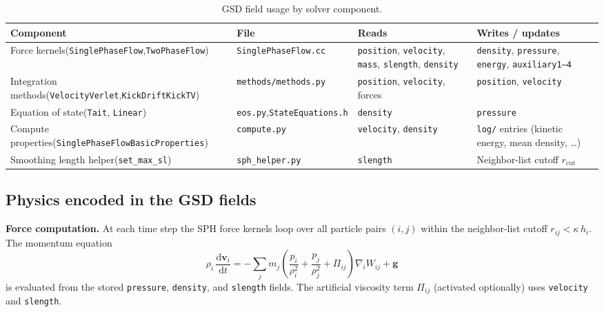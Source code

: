 \documentclass[10pt,a4paper]{article}
\begin{document}
\begin{table}[h]
\centering
\caption{GSD field usage by solver component.}
\label{tab:usage}
\small
\begin{tabular}{@{}p{3.2cm}lp{3.2cm}p{3.2cm}@{}}
\toprule
\textbf{Component} & \textbf{File} & \textbf{Reads} & \textbf{Writes / updates}\\
\midrule
Force kernels\newline (\texttt{SinglePhaseFlow},\newline \texttt{TwoPhaseFlow})
  & \texttt{SinglePhaseFlow.cc}
  & \texttt{position}, \texttt{velocity}, \texttt{mass}, \texttt{slength}, \texttt{density}
  & \texttt{density}, \texttt{pressure}, \texttt{energy}, \texttt{auxiliary1--4}\\[4pt]
Integration methods\newline (\texttt{VelocityVerlet},\newline \texttt{KickDriftKickTV})
  & \texttt{methods/methods.py}
  & \texttt{position}, \texttt{velocity}, forces
  & \texttt{position}, \texttt{velocity}\\[4pt]
Equation of state\newline (\texttt{Tait}, \texttt{Linear})
  & \texttt{eos.py},\newline \texttt{StateEquations.h}
  & \texttt{density}
  & \texttt{pressure}\\[4pt]
Compute properties\newline (\texttt{SinglePhaseFlow\-BasicProperties})
  & \texttt{compute.py}
  & \texttt{velocity}, \texttt{density}
  & \texttt{log/} entries (kinetic energy, mean density, \ldots)\\[4pt]
Smoothing length helper\newline (\texttt{set\_max\_sl})
  & \texttt{sph\_helper.py}
  & \texttt{slength}
  & Neighbor-list cutoff $r_\mathrm{cut}$\\
\bottomrule
\end{tabular}
\end{table}

\subsection{Physics encoded in the GSD fields}

\textbf{Force computation.}
At each time step the SPH force kernels loop over all particle pairs $(i,j)$
within the neighbor-list cutoff $r_{ij} < \kappa\,h_i$.  The momentum equation
\[
  \rho_i\,\frac{\mathrm{d}\mathbf{v}_i}{\mathrm{d}t}
  = -\sum_j m_j \!\left(\frac{p_i}{\rho_i^2} + \frac{p_j}{\rho_j^2}
    + \Pi_{ij}\right)\nabla_i W_{ij}
    + \mathbf{g}
\]
is evaluated from the stored \texttt{pressure}, \texttt{density}, and
\texttt{slength} fields.  The artificial viscosity term $\Pi_{ij}$ (activated
optionally) uses \texttt{velocity} and \texttt{slength}.
\end{document}
